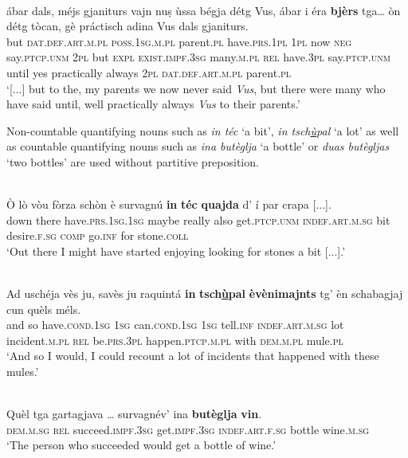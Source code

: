 \ea
\label{}
\\
\gll  [...] ábar dals, méjs gjaniturs vajn nuṣ ùssa bégja détg Vus, ábar i éra \textbf{bjèrs} tga… òn détg tòcan, gè práctisch adina Vus dals gjaniturs.  \\
{} but \textsc{dat.def.art.m.pl} \textsc{poss.1sg.m.pl} parent.\textsc{pl} have.\textsc{prs.1pl} \textsc{1pl} now \textsc{neg} say.\textsc{ptcp.unm} \textsc{2pl} but \textsc{expl} \textsc{exist.impf.3sg}  many.\textsc{m.pl} \textsc{rel} have.\textsc{3pl} say.\textsc{ptcp.unm} until yes practically always \textsc{2pl} \textsc{dat.def.art.m.pl} parent.\textsc{pl}\\
\glt `[...] but to the, my parents we now never said \textit{Vus}, but there were many who have said until, well practically always \textit{Vus} to their parents.'
\z

Non-countable quantifying nouns such as \textit{in téc} `a bit', \textit{in tsch\underline{ù}pal} `a lot' as well as countable quantifying nouns such as \textit{ina butèglja} `a bottle' or \textit{duas butègljas} `two bottles' are used without partitive preposition.

\ea
\label{}
\\
\gll  Ò lò vòu fòrza schòn è survagnú \textbf{in} \textbf{téc} \textbf{quajda} d' í par crapa [...].\\
down there  have.\textsc{prs.1sg.1sg} maybe really also get.\textsc{ptcp.unm} \textsc{indef.art.m.sg} bit desire.\textsc{f.sg} \textsc{comp} go.\textsc{inf} for stone.\textsc{coll} \\
\glt `Out there I might have started enjoying looking for stones a bit [...].'
\z

\ea
\label{}
\\
\gll  Ad uschéja vès ju, savès ju raquintá \textbf{in} \textbf{tsch\underline{ù}pal} \textbf{èvènimajnts} tg’ èn schabagjaj cun quèls méls.\\
and so have.\textsc{cond.1sg} \textsc{1sg} can.\textsc{cond.1sg} \textsc{1sg} tell.\textsc{inf} \textsc{indef.art.m.sg} lot incident.\textsc{m.pl} \textsc{rel} be.\textsc{prs.3pl} happen.\textsc{ptcp.m.pl} with \textsc{dem.m.pl} mule.\textsc{pl}\\
\glt `And so I would, I could recount a lot of incidents that happened with these mules.'
\z

\ea
\label{}
\\
\gll    Quèl tga gartagjava … survagnév’ ina \textbf{butèglja} \textbf{vin}.\\
\textsc{dem.m.sg} \textsc{rel} succeed.\textsc{impf.3sg} {} get.\textsc{impf.3sg} \textsc{indef.art.f.sg} bottle wine.\textsc{m.sg}\\
\glt `The person who succeeded would get a bottle of wine.'
\z


